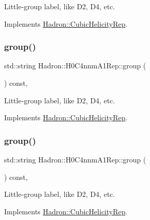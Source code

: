 Little-\/group label, like D2, D4, etc. 

Implements \mbox{\hyperlink{structHadron_1_1CubicHelicityRep_a101a7d76cd8ccdad0f272db44b766113}{Hadron\+::\+Cubic\+Helicity\+Rep}}.

\mbox{\label{structHadron_1_1H0C4nnmA1Rep_a285f5eda1399e94ac66264af1a41c08a}} 
\subsubsection{\texorpdfstring{group()}{group()}\hspace{0.1cm}{\footnotesize\ttfamily [3/5]}}
{\footnotesize\ttfamily std\+::string Hadron\+::\+H0\+C4nnm\+A1\+Rep\+::group (\begin{DoxyParamCaption}{ }\end{DoxyParamCaption}) const\hspace{0.3cm}{\ttfamily [inline]}, {\ttfamily [virtual]}}

Little-\/group label, like D2, D4, etc. 

Implements \mbox{\hyperlink{structHadron_1_1CubicHelicityRep_a101a7d76cd8ccdad0f272db44b766113}{Hadron\+::\+Cubic\+Helicity\+Rep}}.

\mbox{\label{structHadron_1_1H0C4nnmA1Rep_a285f5eda1399e94ac66264af1a41c08a}} 
\subsubsection{\texorpdfstring{group()}{group()}\hspace{0.1cm}{\footnotesize\ttfamily [4/5]}}
{\footnotesize\ttfamily std\+::string Hadron\+::\+H0\+C4nnm\+A1\+Rep\+::group (\begin{DoxyParamCaption}{ }\end{DoxyParamCaption}) const\hspace{0.3cm}{\ttfamily [inline]}, {\ttfamily [virtual]}}

Little-\/group label, like D2, D4, etc. 

Implements \mbox{\hyperlink{structHadron_1_1CubicHelicityRep_a101a7d76cd8ccdad0f272db44b766113}{Hadron\+::\+Cubic\+Helicity\+Rep}}.

